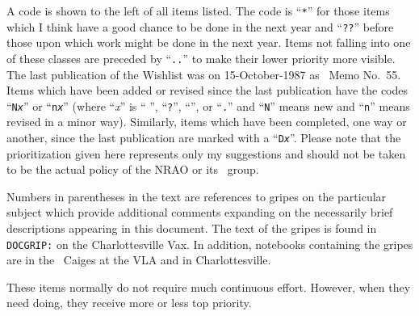      A code is shown to the left of all items listed.  The code
is ``{\tt **}'' for those items which I think have a good chance
to be done in the next year and ``{\tt ??}'' before those upon
which work might be done in the next year.  Items not falling
into one of these classes are preceded by ``{\tt ..}'' to make
their lower priority more visible.  The last publication of the
Wishlist was on 15-October-1987 as \AIPS\ Memo No.~55.  Items
which have been added or revised since the last publication
have the codes ``{\tt N{\it x}}'' or ``{\tt n{\it x}}'' (where
``{\it x}'' is `` '', ``{\tt ?}'', ``{\tt *}'', or ``{\tt .}''
and ``{\tt N}'' means new and ``{\tt n}'' means revised in a
minor way).  Similarly, items which have been completed, one
way or another, since the last publication are marked with a
``{\tt D{\it x}}''.  Please note that the prioritization given
here represents only my suggestions and should not be taken to
be the actual policy of the NRAO or its \AIPS\ group.

     Numbers in parentheses in the text are references to gripes
on the particular subject which provide additional comments
expanding on the necessarily brief descriptions appearing in this
document.  The text of the gripes is found in {\tt DOCGRIP:} on
the Charlottesville Vax.  In addition, notebooks containing
the gripes are in the \AIPS\ Caiges at the VLA and in Charlottesville.

\botpage
{}

These items normally do not require much continuous effort.  However,
when they need doing, they receive more or less top priority.\par
\vskip 7pt

\sect{**}{\Aipsletter:}


\sect{**}{\Cookbook:}



